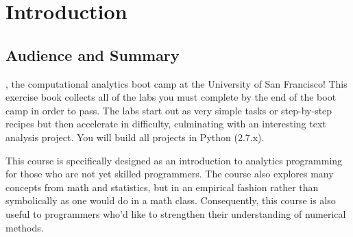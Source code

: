 \chapter{Introduction}

\section{Audience and Summary}

, the computational analytics boot camp at the University of San Francisco! This exercise book collects all of the labs you must complete by the end of the boot camp in order to pass.  The labs start out as very simple tasks or step-by-step recipes but then accelerate in difficulty, culminating with an interesting text analysis project. You will build all projects in Python (2.7.x).


This course is specifically designed as an introduction to analytics programming for those who are not yet skilled programmers. The course also explores many concepts from math and statistics, but in an empirical fashion rather than symbolically as one would do in a math class. Consequently, this course is also useful to programmers who'd like to strengthen their understanding of numerical methods.

